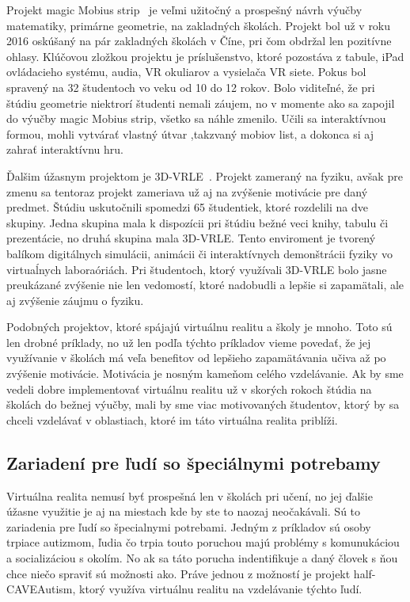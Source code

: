 \documentclass[10pt,oneside,slovak,a4paper]{article}
\begin{document}
Projekt magic Mobius strip~\cite{Math} je veľmi užitočný a prospešný návrh výučby matematiky, primárne geometrie, na zakladných školách. Projekt bol už v roku 2016 oskúšaný na pár zakladných školách v Číne, pri čom obdržal len pozitívne ohlasy. Klúčovou zložkou projektu je príslušenstvo, ktoré pozostáva z tabule, iPad ovládacieho systému, audia, VR okuliarov a vysielača VR siete. Pokus bol spravený na 32 študentoch vo veku od 10 do 12 rokov. Bolo viditeľné, že pri štúdiu geometrie niektrorí študenti nemali záujem, no v momente ako sa zapojil do výučby magic Mobius strip, všetko sa náhle zmenilo. Učili sa interaktívnou formou, mohli vytvárať vlastný útvar ,takzvaný mobiov list, a dokonca si aj zahrať interaktívnu hru.

Ďalšim úžasnym projektom je 3D-VRLE~\cite{Physics}. Projekt zameraný na fyziku, avšak pre zmenu sa tentoraz projekt zameriava už aj na zvýšenie motivácie pre daný predmet. Štúdiu uskutočnili spomedzi 65 študentiek, ktoré rozdelili na dve skupiny. Jedna skupina mala k dispozícii pri štúdiu bežné veci knihy, tabulu či prezentácie, no druhá skupina mala 3D-VRLE. Tento enviroment je tvorený balíkom digitálnych simulácii, animácii či interaktívnych demonštrácii fyziky vo virtuaĺnych laboraóriách. Pri študentoch, ktorý využívali 3D-VRLE bolo jasne preukázané zvýšenie nie len vedomostí, ktoré nadobudli a lepšie si zapamätali, ale aj zvýšenie záujmu o fyziku.

Podobných projektov, ktoré spájajú virtuálnu realitu a školy je mnoho. Toto sú len drobné príklady, no už len podľa týchto príkladov vieme povedať, že jej využívanie v školách má veľa benefitov od lepšieho zapamätávania učiva až po zvýšenie motivácie. Motivácia je nosným kameňom celého vzdelávanie. Ak by sme vedeli dobre implementovať virtuálnu realitu už v skorých rokoch štúdia na školách do bežnej výučby, mali by sme viac motivovaných študentov, ktorý by sa chceli vzdelávať v oblastiach, ktoré im táto virtuálna realita priblíži.  


\subsection{Zariadení pre ľudí so špeciálnymi potrebamy} \label{školy:zariadenia}
Virtuálna realita nemusí byť prospešná len v školách pri učení, no jej ďalšie úžasne využitie je aj na miestach kde by ste to naozaj neočakávali. Sú to zariadenia pre ľudí so špecialnymi potrebami. Jedným z príkladov sú osoby trpiace autizmom, ľudia čo trpia touto poruchou majú problémy s komunukáciou a socializáciou s okolím. No ak sa táto porucha indentifikuje a daný človek s ňou chce niečo spraviť sú možnosti ako. Práve jednou z možností je projekt half-CAVEAutism, ktorý využíva virtuálnu realitu na vzdelávanie týchto ľudí.
\end{document}
